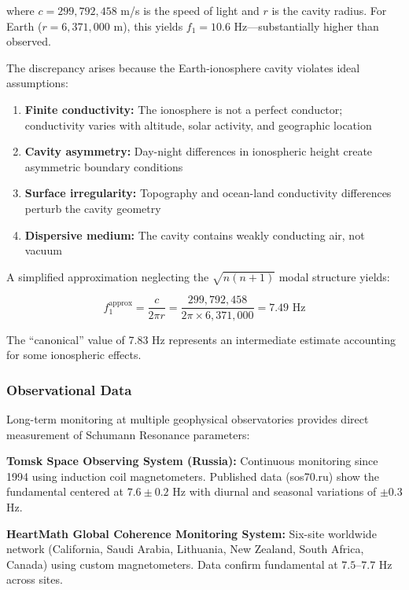 \documentclass[11pt,a4paper]{article}
\begin{document}
where $c = 299,792,458$ m/s is the speed of light and $r$ is the cavity radius. For Earth ($r = 6,371,000$ m), this yields $f_1 = 10.6$ Hz---substantially higher than observed.

The discrepancy arises because the Earth-ionosphere cavity violates ideal assumptions:

\begin{enumerate}
    \item \textbf{Finite conductivity:} The ionosphere is not a perfect conductor; conductivity varies with altitude, solar activity, and geographic location
    \item \textbf{Cavity asymmetry:} Day-night differences in ionospheric height create asymmetric boundary conditions  
    \item \textbf{Surface irregularity:} Topography and ocean-land conductivity differences perturb the cavity geometry
    \item \textbf{Dispersive medium:} The cavity contains weakly conducting air, not vacuum
\end{enumerate}

A simplified approximation neglecting the $\sqrt{n(n+1)}$ modal structure yields:

\begin{equation}
f_1^{\text{approx}} = \frac{c}{2\pi r} = \frac{299,792,458}{2\pi \times 6,371,000} = 7.49 \text{ Hz}
\label{eq:simplified}
\end{equation}

The ``canonical'' value of 7.83 Hz represents an intermediate estimate accounting for some ionospheric effects.

\subsubsection{Observational Data}

Long-term monitoring at multiple geophysical observatories provides direct measurement of Schumann Resonance parameters:

\textbf{Tomsk Space Observing System (Russia):} Continuous monitoring since 1994 using induction coil magnetometers. Published data (sos70.ru) show the fundamental centered at $7.6 \pm 0.2$ Hz with diurnal and seasonal variations of $\pm 0.3$ Hz.

\textbf{HeartMath Global Coherence Monitoring System:} Six-site worldwide network (California, Saudi Arabia, Lithuania, New Zealand, South Africa, Canada) using custom magnetometers. Data confirm fundamental at $7.5$--$7.7$ Hz across sites.
\end{document}
